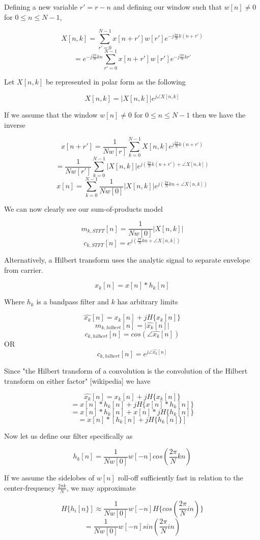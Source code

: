 \documentclass [11pt, proquest] {uwthesis}[2015/03/03]
\begin{document}
Defining a new variable $r' = r - n$ and defining our window such that  $w[n] \neq 0$ for $0 \leq n \leq N-1$,

$$X[n,k] = \sum\limits_{r'=0}^{N-1} x[n + r'] w[r'] e^{-j\frac{2\pi}{N}k(n + r')}$$
$$= e^{-j\frac{2\pi}{N}kn} \sum\limits_{r'=0}^{N-1} x[n + r'] w[r'] e^{-j\frac{2\pi}{N}kr'}$$

Let $X[n,k]$ be represented in polar form as the following

$$X[n,k] = \vert X[n,k]\vert e^{j\angle X[n,k]}$$

If we assume that the window $w[n] \neq 0$ for $0 \leq n \leq N-1$ then we have the inverse

$$x[n + r'] = \frac{1}{Nw[r]}  \sum\limits_{k=0}^{N-1} X[n,k] e^{j\frac{2\pi}{N}k(n+r')}$$
$$= \frac{1}{Nw[r']}  \sum\limits_{k=0}^{N-1} \vert X[n,k]\vert e^{j(\frac{2\pi}{N}k(n+r') + \angle X[n,k])}$$
$$x[n] =\sum\limits_{k=0}^{N-1}  \frac{1}{Nw[0]}  \vert X[n,k]\vert e^{j(\frac{2\pi}{N}kn + \angle X[n,k])}$$

We can now clearly see our sum-of-products model

$$m_{k,STFT}[n] =  \frac{1}{Nw[0]}  \vert X[n,k]\vert$$
$$c_{k,STFT}[n] = e^{j(\frac{2\pi}{N}kn + \angle X[n,k])}$$

Alternatively, a Hilbert transform uses the analytic signal to separate envelope from carrier.

$$x_k[n] = x[n] * h_k[n]$$

Where $h_k$ is a bandpass filter and $k$ has arbitrary limits

$$\widehat{x_k}[n] = x_k[n] + jH\{x_k[n]\}$$
$$m_{k,hilbert}[n] = \vert\widehat{x_k}[n]\vert$$
$$c_{k,hilbert}[n] = cos(\angle\widehat{x_k}[n])$$
OR
$$c_{k,hilbert}[n] = e^{j\angle\widehat{x_k}[n]}$$

Since "the Hilbert transform of a convolution is the convolution of the Hilbert transform on either factor" [wikipedia] we have 

$$\widehat{x_k}[n] = x_k[n] + jH\{x_k[n]\}$$
$$= x[n] * h_k[n] + jH\{x[n] * h_k[n]\}$$
$$= x[n] * h_k[n] + x[n] * jH\{h_k[n]\}$$
$$= x[n] * [h_k[n]+  jH\{h_k[n]\}]$$

Now let us define our filter specifically as

$$h_k[n] = \frac{1}{Nw[0]}w[-n]cos(\frac{2\pi}{N}kn)$$

If we assume the sidelobes of $w[n]$ roll-off sufficiently fast in relation to the center-frequency $\frac{2\pi k}{N}$, we may approximate

$$H\{h_i[n\}] \approx \frac{1}{Nw[0]}w[-n] H\{cos(\frac{2\pi}{N}in)\}$$
$$= \frac{1}{Nw[0]}w[-n]sin(\frac{2\pi}{N}in)$$
\end{document}
